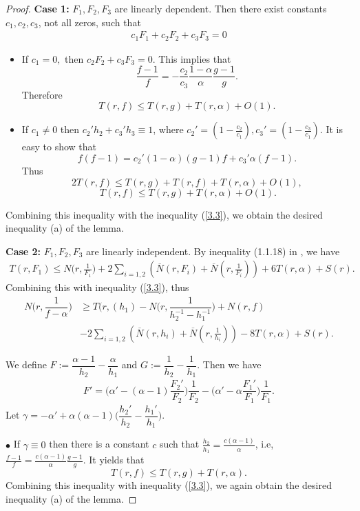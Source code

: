 \documentclass[12pt,leqno]{amsart}
\numberwithin{equation}{section}
\begin{document}
\begin{proof}
\textbf{Case 1:} $F_1,F_2,F_3$ are linearly dependent. Then there exist constants $c_1,c_2,c_3$, not all zeros, such that
\begin{align*}
    c_1F_1+c_2F_2+c_3F_3=0
\end{align*}
\begin{itemize}
    \item If $c_1 =0,$ then $c_2F_2+c_3F_3=0$. This implies that 
		$$\frac{f-1}{f}=-\frac{c_2}{c_3}\frac{1-\alpha}{\alpha}\frac{g-1}{g}.$$
		Therefore
		$$T(r,f)\le T(r,g)+T(r,\alpha)+O(1).$$
	\item If $c_1\neq 0$ then $c_2'h_2+c_3'h_3\equiv 1$, where $\displaystyle c_2'=(1-\frac{c_2}{c_1}),c_3'=(1-\frac{c_3}{c_1}).$
		It is easy to show that
		$$f(f-1)=c_2'(1-\alpha)(g-1)f+c_3'\alpha(f-1).$$
		Thus
		$$2T(r,f)\le T(r,g)+T(r,f)+T(r,\alpha)+O(1),$$
		$$\ T(r,f)\le T(r,g)+T(r,\alpha)+O(1).$$
\end{itemize}     
Combining this inequality with the inequality (\ref{3.3}), we obtain the desired inequality (a) of the lemma.

\textbf{Case 2:} $F_1,F_2,F_3$ are linearly independent. By inequality (1.1.18) in \cite[Lemma 1.102]{PPC}, we have
 \begin{align*}
			T(r,F_1)\le N\Big(r,\frac{1}{F_1}\Big)+2\sum_{i=1,2}\left(\overline{N}(r,F_i)+\overline{N}(r,\frac{1}{F_i})\right)+6T(r,\alpha)+S(r).
\end{align*}
Combining this with inequality (\ref{3.3}), thus
\begin{align*}
			N\Big(r,\dfrac{1}{f-\alpha}\Big)&\ge T(r,(h_1)-N\Big(r,\dfrac{1}{h_2^{-1}-h_1^{-1}}\Big)+N(r,f)\\
			&-2\sum_{i=1,2}\left(\overline{N}(r,h_i)+\overline{N}(r,\frac{1}{h_i})\right)-8T(r,\alpha)+S(r).
\end{align*}	

We define $F:=\dfrac{\alpha-1}{h_2}-\dfrac{\alpha}{h_1}$ and $G:=\dfrac{1}{h_2}-\dfrac{1}{h_1}$. Then we have 
\begin{align}\label{3.13}
F'=\Big(\alpha'-(\alpha-1)\dfrac{F_2'}{F_2}\Big)\dfrac{1}{F_2}-\Big(\alpha'-\alpha\dfrac{F_1'}{F_1}\Big)\dfrac{1}{F_1}.
\end{align}
Let $\gamma=-\alpha'+\alpha(\alpha-1)\Big(\dfrac{h_2'}{h_2}-\dfrac{h_1'}{h_1}\Big).$

$\bullet$  If $\gamma\equiv 0$ then there is a constant $c$ such that
		$\frac{h_2}{h_1}=\frac{c(\alpha-1)}{\alpha}$, i.e, $\frac{f-1}{f}=\frac{c(\alpha-1)}{\alpha}\frac{g-1}{g}$. It yields that
		$$T(r,f)\le T(r,g)+T(r,\alpha).$$
		Combining this inequality with inequality (\ref{3.3}), we again obtain the desired inequality (a) of the lemma.


\end{proof}
\end{document}
